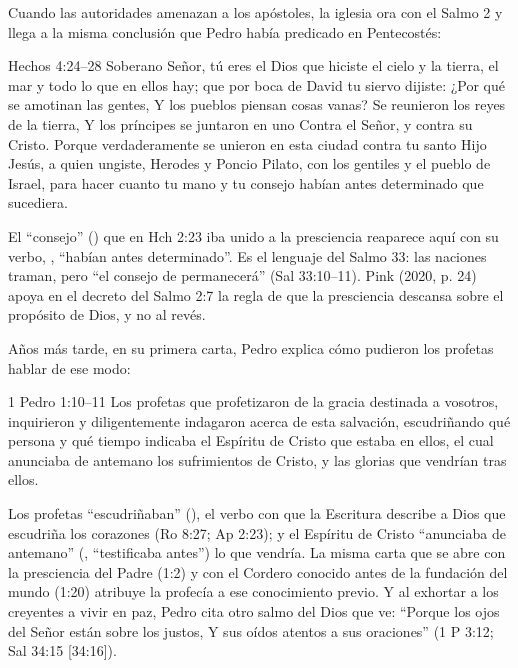 Cuando las autoridades amenazan a los apóstoles, la iglesia ora con el Salmo 2 y llega a la misma conclusión que Pedro había predicado en Pentecostés:

\begin{verso}{Hechos 4:24–28}
Soberano Señor, tú eres el Dios que hiciste el cielo y la tierra, el mar y todo lo que en ellos hay; que por boca de David tu siervo dijiste: ¿Por qué se amotinan las gentes, Y los pueblos piensan cosas vanas? Se reunieron los reyes de la tierra, Y los príncipes se juntaron en uno Contra el Señor, y contra su Cristo. Porque verdaderamente se unieron en esta ciudad contra tu santo Hijo Jesús, a quien ungiste, Herodes y Poncio Pilato, con los gentiles y el pueblo de Israel, para hacer cuanto tu mano y tu consejo habían antes determinado que sucediera.
\end{verso}

El ``consejo'' () que en Hch 2:23 iba unido a la presciencia reaparece aquí con su verbo, , ``habían antes determinado''. Es el lenguaje del Salmo 33: las naciones traman, pero ``el consejo de \SENOR{} permanecerá'' (Sal 33:10--11). Pink (2020, p. 24) apoya en el decreto del Salmo 2:7 la regla de que la presciencia descansa sobre el propósito de Dios, y no al revés.

Años más tarde, en su primera carta, Pedro explica cómo pudieron los profetas hablar de ese modo:

\begin{verso}{1 Pedro 1:10–11}
Los profetas que profetizaron de la gracia destinada a vosotros, inquirieron y diligentemente indagaron acerca de esta salvación, escudriñando qué persona y qué tiempo indicaba el Espíritu de Cristo que estaba en ellos, el cual anunciaba de antemano los sufrimientos de Cristo, y las glorias que vendrían tras ellos.
\end{verso}

Los profetas ``escudriñaban'' (), el verbo con que la Escritura describe a Dios que escudriña los corazones (Ro 8:27; Ap 2:23); y el Espíritu de Cristo ``anunciaba de antemano'' (, ``testificaba antes'') lo que vendría. La misma carta que se abre con la presciencia del Padre (1:2) y con el Cordero conocido antes de la fundación del mundo (1:20) atribuye la profecía a ese conocimiento previo. Y al exhortar a los creyentes a vivir en paz, Pedro cita otro salmo del Dios que ve: ``Porque los ojos del Señor están sobre los justos, Y sus oídos atentos a sus oraciones'' (1 P 3:12; Sal 34:15 [34:16]).

